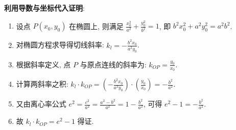\begin{proofbox}
\textbf{利用导数与坐标代入证明}:
\begin{enumerate}
    \item 设点 $P(x_0, y_0)$ 在椭圆上, 则满足 $\frac{x_0^2}{a^2} + \frac{y_0^2}{b^2} = 1$, 即 $b^2x_0^2 + a^2y_0^2 = a^2b^2$.
    \item 对椭圆方程求导得切线斜率: $k_l = -\frac{b^2x_0}{a^2y_0}$.
    \item 根据斜率定义, 点 $P$ 与原点连线的斜率为: $k_{OP} = \frac{y_0}{x_0}$.
    \item 计算两斜率之积:
    $k_l \cdot k_{OP} = \left( -\frac{b^2x_0}{a^2y_0} \right) \cdot \left( \frac{y_0}{x_0} \right) = -\frac{b^2}{a^2}$.
    \item 又由离心率公式 $e^2 = \frac{c^2}{a^2} = \frac{a^2-b^2}{a^2} = 1 - \frac{b^2}{a^2}$, 可得 $e^2 - 1 = -\frac{b^2}{a^2}$.
    \item 故 $k_l \cdot k_{OP} = e^2 - 1$ 得证.
\end{enumerate}
\end{proofbox}